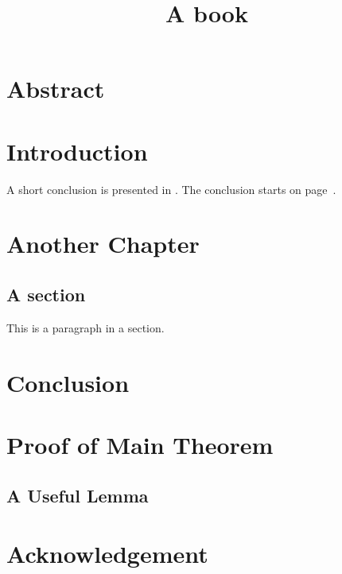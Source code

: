 \documentclass[12pt,a4paper]{book}
\title{A book}
\begin{document}
  
  \frontmatter
    \maketitle
    \tableofcontents
    \chapter{Abstract}
  \mainmatter
    \chapter{Introduction}
      A short conclusion is presented in . 
      The conclusion starts on page~\pageref{conclusion}.
    \chapter{Another Chapter}
      \section{A section}
        This is a paragraph in a section.
    \chapter{Conclusion}
      \label{conclusion}
    \appendix
      \chapter{Proof of Main Theorem}
        \section{A Useful Lemma}
  \backmatter
    \chapter*{Acknowledgement}
    
\end{document}
